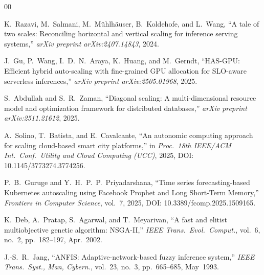 \documentclass[conference]{IEEEtran}
\begin{document}
\begin{thebibliography}{00}

K.~Razavi, M.~Salmani, M.~M\"uhlh\"auser, B.~Koldehofe, and L.~Wang, ``A tale of two scales: Reconciling horizontal and vertical scaling for inference serving systems,'' \emph{arXiv preprint arXiv:2407.14843}, 2024.

J.~Gu, P.~Wang, I.~D.~N.~Araya, K.~Huang, and M.~Gerndt, ``HAS-GPU: Efficient hybrid auto-scaling with fine-grained GPU allocation for SLO-aware serverless inferences,'' \emph{arXiv preprint arXiv:2505.01968}, 2025.

S.~Abdullah and S.~R.~Zaman, ``Diagonal scaling: A multi-dimensional resource model and optimization framework for distributed databases,'' \emph{arXiv preprint arXiv:2511.21612}, 2025.

A.~Solino, T.~Batista, and E.~Cavalcante, ``An autonomic computing approach for scaling cloud-based smart city platforms,'' in \emph{Proc.\ 18th IEEE/ACM Int.\ Conf.\ Utility and Cloud Computing (UCC)}, 2025, DOI: 10.1145/3773274.3774256.

P.~B.~Guruge and Y.~H.~P.~P.~Priyadarshana, ``Time series forecasting-based Kubernetes autoscaling using Facebook Prophet and Long Short-Term Memory,'' \emph{Frontiers in Computer Science}, vol.~7, 2025, DOI: 10.3389/fcomp.2025.1509165.

K.~Deb, A.~Pratap, S.~Agarwal, and T.~Meyarivan, ``A fast and elitist multiobjective genetic algorithm: NSGA-II,'' \emph{IEEE Trans.\ Evol.\ Comput.}, vol.~6, no.~2, pp.~182--197, Apr.~2002.

J.-S.~R.~Jang, ``ANFIS: Adaptive-network-based fuzzy inference system,'' \emph{IEEE Trans.\ Syst., Man, Cybern.}, vol.~23, no.~3, pp.~665--685, May~1993.

\end{thebibliography}
\end{document}
